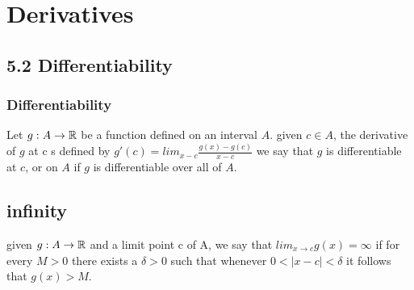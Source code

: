 \documentclass{article}
\begin{document}
\section{Derivatives}
\subsection*{5.2 Differentiability}
\subsubsection*{Differentiability}
Let $g:A\to \protect\mathbb{R}$ be a function defined on an interval $A$. given $c \in A $, the derivative of $g$ at c s defined by
$g'(c) = lim_{x-c} \frac{g(x) - g(c)}{x-c}$
we say that $g$ is differentiable at $c$, or on $A$ if $g$ is differentiable over all of $A$.

\subsection*{infinity}
given $g:A \to \protect\mathbb{R}$ and a limit point c of A, we say that $lim_{x\to c} g(x) = \infty$ if for every $M>0$ there exists a $\delta >0$ such that whenever $0 < |x-c| < \delta$ it follows that $g(x) > M$.
\end{document}

